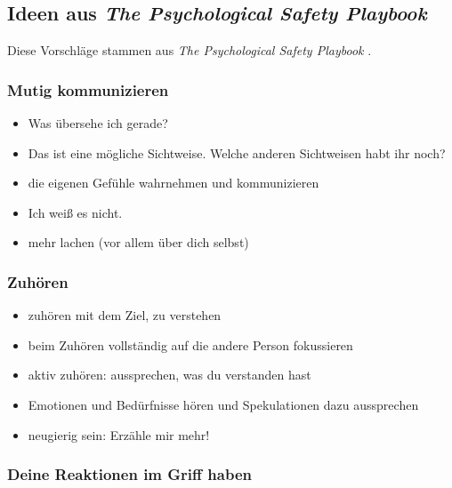 \subsection{Ideen aus \emph{The Psychological Safety Playbook}}

Diese Vorschläge stammen aus \emph{The Psychological Safety Playbook} \cite{psychological-safety-playbook}.

\subsubsection{Mutig kommunizieren}

\begin{itemize}
    \item \glqq Was übersehe ich gerade?\grqq
    \item \glqq Das ist eine mögliche Sichtweise. Welche anderen Sichtweisen habt ihr noch?\grqq
    \item die eigenen Gefühle wahrnehmen und kommunizieren 
    \item \glqq Ich weiß es nicht.\grqq
    \item mehr lachen (vor allem über dich selbst) 
\end{itemize}

\subsubsection{Zuhören}

\begin{itemize}
    \item zuhören mit dem Ziel, zu verstehen
    \item beim Zuhören vollständig auf die andere Person fokussieren
    \item aktiv zuhören: aussprechen, was du verstanden hast 
    \item Emotionen und Bedürfnisse hören und Spekulationen dazu aussprechen 
    \item neugierig sein: \glqq Erzähle mir mehr!\grqq {}
\end{itemize}

\subsubsection{Deine Reaktionen im Griff haben}

